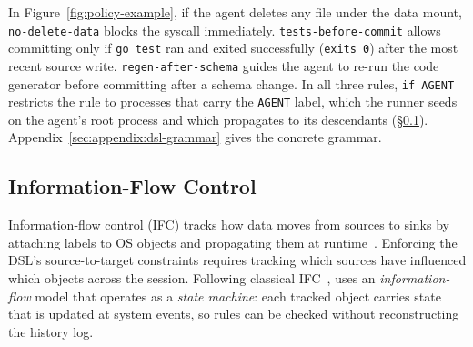 In Figure~\ref{fig:policy-example}, if the agent deletes any file under the data mount, \texttt{no-delete-data} blocks the syscall immediately.
\texttt{tests-before-commit} allows committing only if \texttt{go test} ran and exited successfully (\texttt{exits~0}) after the most recent source write.
\texttt{regen-after-schema} guides the agent to re-run the code generator before committing after a schema change.
In all three rules, \texttt{if AGENT} restricts the rule to processes that carry the \texttt{AGENT} label, which the runner seeds on the agent's root process and which propagates to its descendants (\S\ref{sec:ifc}).
Appendix~\ref{sec:appendix:dsl-grammar} gives the concrete grammar.

\subsection{Information-Flow Control}
\label{sec:ifc}

Information-flow control (IFC) tracks how data moves from sources to sinks by attaching labels to OS objects and propagating them at runtime~\cite{myers1999jflow,flume,zeldovich2006histar,pasquier2017camflow}.
Enforcing the DSL's source-to-target constraints requires tracking which sources have influenced which objects across the session.
Following classical IFC~\cite{flume,zeldovich2006histar}, \sys{} uses an \emph{information-flow} model that operates as a \emph{state machine}: each tracked object carries state that is updated at system events, so rules can be checked without reconstructing the history log.

